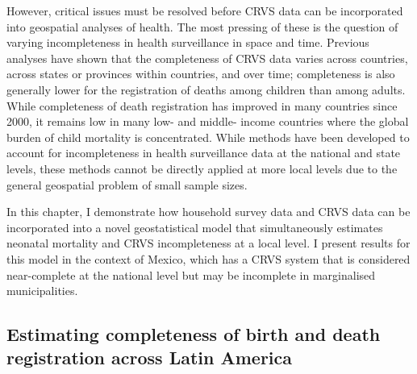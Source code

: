 \documentclass[
]{report}
\begin{document}
However, critical issues must be resolved before CRVS data can be incorporated into geospatial analyses of health. The most pressing of these is the question of varying incompleteness in health surveillance in space and time. Previous analyses have shown that the completeness of CRVS data varies across countries, across states or provinces within countries, and over time;\autocite{Adair2018} completeness is also generally lower for the registration of deaths among children than among adults.\autocite{Malqvist2008} While completeness of death registration has improved in many countries since 2000, it remains low in many low- and middle- income countries where the global burden of child mortality is concentrated.\autocite{Mikkelsen2015} While methods have been developed to account for incompleteness in health surveillance data at the national and state levels,\autocite{Murray2010,Silva2015,Bhat2002} these methods cannot be directly applied at more local levels due to the general geospatial problem of small sample sizes.

In this chapter, I demonstrate how household survey data and CRVS data can be incorporated into a novel geostatistical model that simultaneously estimates neonatal mortality and CRVS incompleteness at a local level. I present results for this model in the context of Mexico, which has a CRVS system that is considered near-complete at the national level but may be incomplete in marginalised municipalities.

\hypertarget{estimating-completeness-of-birth-and-death-registration-across-latin-america}{%
\subsection{Estimating completeness of birth and death registration across Latin America}\label{estimating-completeness-of-birth-and-death-registration-across-latin-america}}
\end{document}
